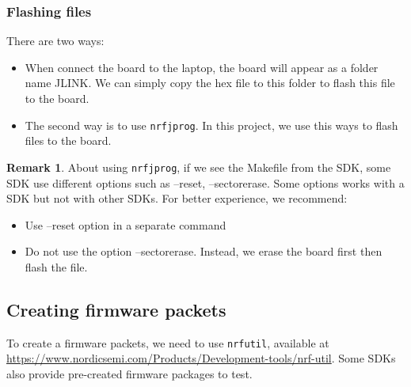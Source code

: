 \documentclass{article}
\theoremstyle{plain}
\theoremstyle{definition}
\newtheorem{remark}{Remark}
\numberwithin{equation}{section}
\begin{document}
\subsubsection{Flashing files}
There are two ways:
\begin{itemize}
	\item When connect the board to the laptop, the board will appear as a folder name JLINK. We can simply copy the hex file to this folder to flash this file to the board.
	\item The second way is to use \texttt{nrfjprog}. In this project, we use this ways to flash files to the board.
\end{itemize}
\begin{remark}\label{nrfjprog}
	About using \texttt{nrfjprog}, if we see the Makefile from the SDK, some SDK use different options such as --reset, --sectorerase. Some options works with a SDK but not with other SDKs. For better experience, we recommend:
	\begin{itemize}
		\item Use --reset option in a separate command
		\item Do not use the option --sectorerase. Instead, we erase the board first then flash the file.
	\end{itemize}
\end{remark}


\subsection{Creating firmware packets}
To create a firmware packets, we need to use \texttt{nrfutil}, available at \url{https://www.nordicsemi.com/Products/Development-tools/nrf-util}. Some SDKs also provide pre-created firmware packages to test.
\end{document}
